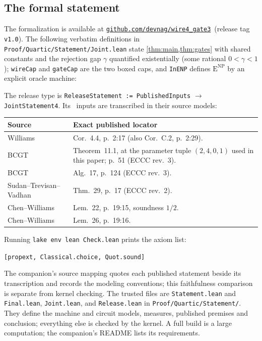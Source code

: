 \documentclass[11pt,letterpaper]{article}
\newcommand{\leanrepo}{%
  \href{https://github.com/devnag/wire4_gate3}{\nolinkurl{github.com/devnag/wire4_gate3}}}
\theoremstyle{definition}
\theoremstyle{remark}
\newcommand{\ENP}{\mathrm{E}^{\mathrm{NP}}}
\begin{document}
\subsection{The formal statement}\label{sec:formal}
The formalization is available at \leanrepo\ (release tag \texttt{v1.0}).
The following verbatim definitions in \texttt{Proof/Quartic/Statement/Joint.lean}
state \cref{thm:main,thm:gates} with shared constants and the rejection gap \(\gamma\) quantified existentially (some rational \(0<\gamma<1\)); \texttt{wireCap} and \texttt{gateCap} are the two boxed caps, and \texttt{InENP} defines \(\ENP\) by an explicit oracle machine:
\begingroup
{}

\endgroup
The release type is \texttt{ReleaseStatement := PublishedInputs}
\(\to\) \texttt{JointStatement4}. Its
\publishedinputcount\ inputs are transcribed in their source models:
\begin{center}\footnotesize
\begin{tabularx}{\textwidth}{@{}lX@{}}\toprule
Source & Exact published locator\\\midrule
Williams~\cite{WilACC14} & Cor.~4.4, p.~2:17 (also Cor.~C.2, p.~2:29).\\
BCGT~\cite{BCGT13} & Theorem~11.1, at the parameter tuple \((2,4,0,1)\) used in this paper; p.~51 (ECCC rev.~3).\\
BCGT~\cite{BCGT13} & Alg.~17, p.~124 (ECCC rev.~3).\\
Sudan--Trevisan--Vadhan~\cite{STV01} & Thm.~29, p.~17 (ECCC rev.~2).\\
Chen--Williams~\cite{CW19} & Lem.~22, p.~19:15, soundness \(1/2\).\\
Chen--Williams~\cite{CW19} & Lem.~26, p.~19:16.\\

\bottomrule\end{tabularx}
\end{center}
Running \texttt{lake env lean Check.lean} prints the axiom list:
\begin{center}\small\texttt{[propext, Classical.choice, Quot.sound]}\end{center}
The companion's source mapping quotes each published statement beside
its transcription and records the modeling conventions; this
faithfulness comparison is separate from kernel checking.
The trusted files are \texttt{Statement.lean} and \texttt{Final.lean},
\texttt{Joint.lean}, and \texttt{Release.lean} in
\texttt{Proof/Quartic/Statement/}. They define the machine and circuit
models, measures, published premises and conclusion; everything else
is checked by the kernel. A full build is a large computation; the
companion's README lists its requirements.
\end{document}

